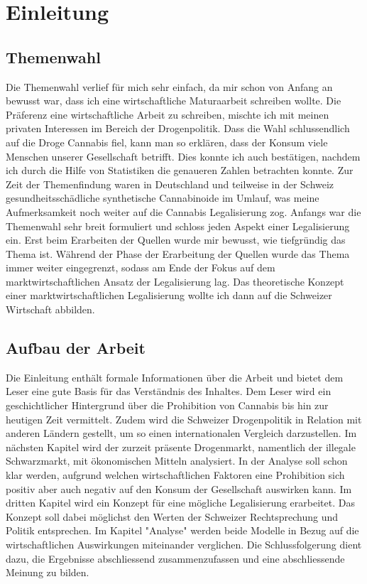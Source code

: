 \documentclass[../main.tex]{subfiles}
\begin{document}
	 \section{Einleitung}
	 
	 \subsection{Themenwahl}
	 Die Themenwahl verlief für mich sehr einfach, da mir schon von Anfang an bewusst war, dass ich eine wirtschaftliche Maturaarbeit schreiben wollte. 
	 Die Präferenz eine wirtschaftliche Arbeit zu schreiben, mischte ich mit meinen privaten Interessen im Bereich der Drogenpolitik. 
	 Dass die Wahl schlussendlich auf die Droge Cannabis fiel, kann man so erklären, dass der Konsum viele Menschen unserer Gesellschaft betrifft. 
	 Dies konnte ich auch bestätigen, nachdem ich durch die Hilfe von Statistiken die genaueren Zahlen betrachten konnte. 
	 Zur Zeit der Themenfindung waren in Deutschland und teilweise in der Schweiz gesundheitsschädliche synthetische Cannabinoide im Umlauf, was meine Aufmerksamkeit noch weiter auf die Cannabis Legalisierung zog.
	 Anfangs war die Themenwahl sehr breit formuliert und schloss jeden Aspekt einer Legalisierung ein. 
	 Erst beim Erarbeiten der Quellen wurde mir bewusst, wie tiefgründig das Thema ist. 
	 Während der Phase der Erarbeitung der Quellen wurde das Thema immer weiter eingegrenzt, sodass am Ende der Fokus auf dem marktwirtschaftlichen Ansatz der Legalisierung lag. 
	 Das theoretische Konzept einer marktwirtschaftlichen Legalisierung wollte ich dann auf die Schweizer Wirtschaft abbilden.
	 
	 \subsection{Aufbau der Arbeit}
	 Die Einleitung enthält formale Informationen über die Arbeit und bietet dem Leser eine gute Basis für das Verständnis des Inhaltes. 
	 Dem Leser wird ein geschichtlicher Hintergrund über die Prohibition von Cannabis bis hin zur heutigen Zeit vermittelt. 
	 Zudem wird die Schweizer Drogenpolitik in Relation mit anderen Ländern gestellt, um so einen internationalen Vergleich darzustellen.
	 Im nächsten Kapitel wird der zurzeit präsente Drogenmarkt, namentlich der illegale Schwarzmarkt, mit ökonomischen Mitteln analysiert. 
	 In der Analyse soll schon klar werden, aufgrund welchen wirtschaftlichen Faktoren eine Prohibition sich positiv aber auch negativ auf den Konsum der Gesellschaft auswirken kann. 
	 Im dritten Kapitel wird ein Konzept für eine mögliche Legalisierung erarbeitet. 
	 Das Konzept soll dabei möglichst den Werten der Schweizer Rechtsprechung und Politik entsprechen. 
	 Im Kapitel "Analyse" werden beide Modelle in Bezug auf die wirtschaftlichen Auswirkungen miteinander verglichen. 
	 Die Schlussfolgerung dient dazu, die Ergebnisse abschliessend zusammenzufassen und eine abschliessende Meinung zu bilden.
	 
\end{document}

